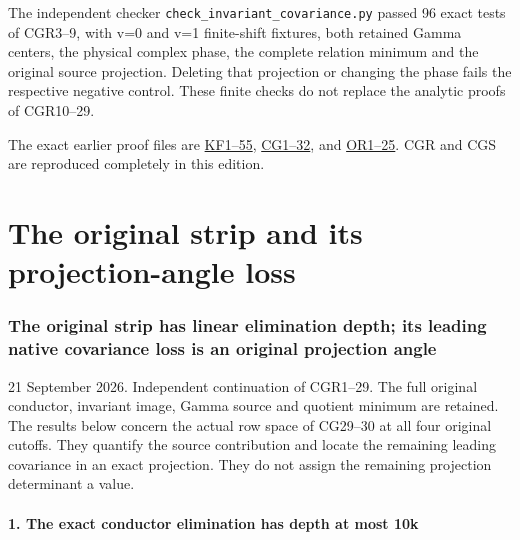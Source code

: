 \documentclass[11pt]{article}
\begin{document}
The independent checker \nolinkurl{check_invariant_covariance.py} passed 96 exact tests of CGR3--9, with v=0 and v=1 finite-shift fixtures, both retained Gamma centers, the physical complex phase, the complete relation minimum and the original source projection. Deleting that projection or changing the phase fails the respective negative control. These finite checks do not replace the analytic proofs of CGR10--29.

The exact earlier proof files are \href{https://github.com/KokunoYumeto/zeta-function-research-reader/blob/0fd693c844aad9117e30ec447c59864a28af10f3/workbenches/splitzero-tandem/continuations/20260921-native-spectral-real-pair/003/ACTUAL_KERNEL_FILTRATION_AND_GRAPH.tex\#L12}{KF1--55}, \href{https://github.com/KokunoYumeto/zeta-function-research-reader/blob/0fd693c844aad9117e30ec447c59864a28af10f3/workbenches/splitzero-tandem/continuations/20260921-native-spectral-real-pair/003/COMPLETE_CONDUCTOR_GRAPH_METRIC.tex}{CG1--32}, and \href{https://github.com/KokunoYumeto/zeta-function-research-reader/blob/0fd693c844aad9117e30ec447c59864a28af10f3/workbenches/splitzero-tandem/continuations/20260921-native-spectral-real-pair/003/COMPLETE_CONDUCTOR_ROOT_GEOMETRY.tex\#L38}{OR1--25}. CGR and CGS are reproduced completely in this edition.


\clearpage\part{The original strip and its projection-angle loss}
\section{The original strip has linear elimination depth; its leading native covariance loss is an original projection angle}\label{the-original-strip-has-linear-elimination-depth-its-leading-native-covariance-loss-is-an-original-projection-angle}

21 September 2026. Independent continuation of CGR1--29. The full original conductor, invariant image, Gamma source and quotient minimum are retained. The results below concern the actual row space of CG29--30 at all four original cutoffs. They quantify the source contribution and locate the remaining leading covariance in an exact projection. They do not assign the remaining projection determinant a value.

\subsection{1. The exact conductor elimination has depth at most 10k}\label{the-exact-conductor-elimination-has-depth-at-most-10k}
\end{document}

